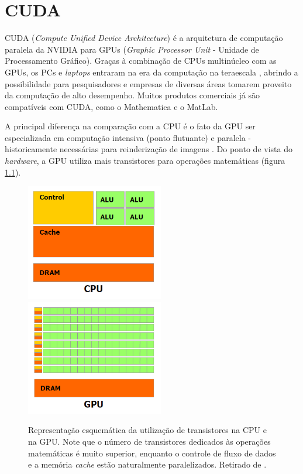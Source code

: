 \chapter{CUDA\label{cap:cuda}}

CUDA (\textit{Compute Unified Device Architecture}) é a arquitetura de computação paralela da NVIDIA para GPUs (\textit{Graphic Processor Unit} - Unidade de Processamento Gráfico). Graças à combinação de CPUs multinúcleo com as GPUs, os PCs e \textit{laptops} entraram na era da computação na teraescala \cite{Kirk2010}, abrindo a possibilidade para pesquisadores e empresas de diversas áreas tomarem proveito da computação de alto desempenho. Muitos produtos comerciais já são compatíveis com CUDA, como o Mathematica e o MatLab.
	
	A principal diferença na comparação com a CPU é o fato da GPU ser especializada em computação intensiva (ponto flutuante) e paralela - historicamente necessárias para reinderização de imagens \cite{CUDACpg}. Do ponto de vista do \textit{hardware}, a GPU utiliza mais transistores para operações matemáticas (figura \ref{figCPU_GPU}). 
	
	\begin{figure}[hpt]
		\begin{center}
			\includegraphics[width=6cm]{figs/cuda/CPU-Transistores.png}
			\includegraphics[width=6cm]{figs/cuda/GPU-Transistores.png}
		\end{center}
		\caption{\label{figCPU_GPU}Representação esquemática da utilização de transistores na CPU e na GPU. Note que o número de transistores dedicados às operações matemáticas é muito superior, enquanto o controle de fluxo de dados e a memória \textit{cache} estão naturalmente paralelizados. Retirado de \cite{CUDACpg}.}
	\end{figure}

